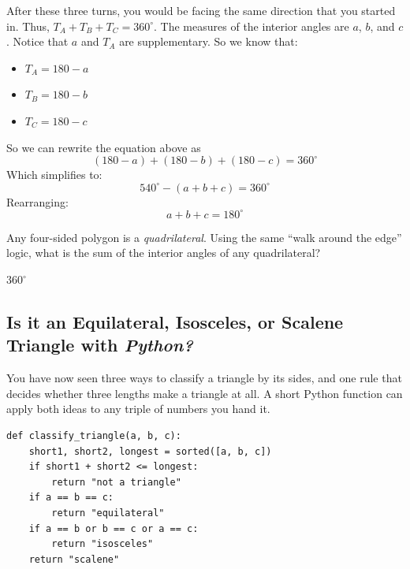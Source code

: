 After these three turns, you would be facing the same direction that
you started in. Thus, $T_A + T_B + T_C = 360^\circ$. The
measures of the interior angles are $a$, $b$, and $c$. Notice that $a$ and
$T_A$ are supplementary. So we know that:
\begin{itemize}
\item $T_A = 180 - a$
\item $T_B = 180 - b$
\item $T_C = 180 - c$
\end{itemize}
So we can rewrite the equation above as
\begin{equation*}
  (180 - a) + (180 - b) + (180 - c) = 360^\circ
\end{equation*}
Which simplifies to:
\begin{equation*}
  540^\circ - (a + b + c) = 360^\circ
\end{equation*}
Rearranging:
\begin{equation*}
  a + b + c = 180^\circ
\end{equation*}

\begin{Exercise}[title={Interior Angles of a Quadrilateral}, label=interior_of_quad]
  Any four-sided polygon is a \emph{quadrilateral}. Using the same
  ``walk around the edge'' logic, what is the sum of the interior
  angles of any quadrilateral?
\end{Exercise}
\begin{Answer}[ref=interior_of_quad]
$360^\circ$
\end{Answer}


\subsection{Is it an Equilateral, Isosceles, or Scalene Triangle with \textit{Python?}}

You have now seen three ways to classify a triangle by its sides, and one rule that decides whether three lengths make a triangle at all. A short Python function can apply both ideas to any triple of numbers you hand it.

\begin{verbatim}
def classify_triangle(a, b, c):
    short1, short2, longest = sorted([a, b, c])
    if short1 + short2 <= longest:
        return "not a triangle"
    if a == b == c:
        return "equilateral"
    if a == b or b == c or a == c:
        return "isosceles"
    return "scalene"
\end{verbatim}


